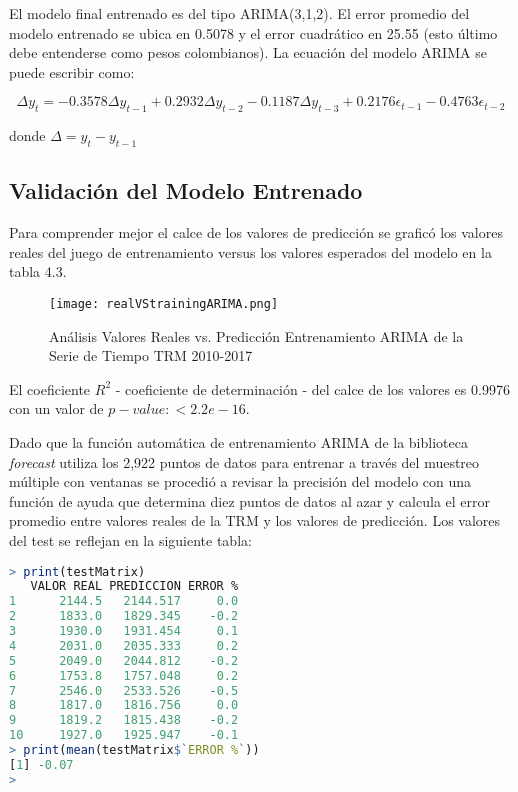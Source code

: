 El modelo final entrenado es del tipo ARIMA(3,1,2). El error promedio del modelo entrenado se ubica en 0.5078 y el error cuadrático en 25.55 (esto último debe entenderse como pesos colombianos). La ecuación del modelo ARIMA se puede escribir como:

\begin{equation}
    \Delta y_t = -0.3578 \Delta y_{t-1} + 0.2932 \Delta y_{t-2} - 0.1187 \Delta y_{t-3} + 0.2176 \epsilon_{t-1} -
    0.4763 \epsilon_{t-2}
\end{equation}

donde $\Delta = y_{t} - y_{t-1}$

\subsection{Validación del Modelo Entrenado}
Para comprender mejor el calce de los valores de predicción se graficó los valores reales del juego de entrenamiento versus los valores esperados del modelo en la tabla 4.3.

\begin{figure}[H]
    \centering
    \texttt{[image: realVStrainingARIMA.png]}
    \caption{Análisis Valores Reales vs. Predicción Entrenamiento ARIMA de la Serie de Tiempo TRM 2010-2017}
\end{figure}

El coeficiente $R^2$ - coeficiente de determinación - del calce de los valores es 0.9976 con un valor de $p-value: < 2.2e-16$.

Dado que la función automática de entrenamiento ARIMA de la biblioteca \emph{forecast} utiliza los 2,922 puntos de datos para entrenar a través del muestreo múltiple con ventanas se procedió a revisar la precisión del modelo con una función de ayuda que determina diez puntos de datos al azar y calcula el error promedio entre valores reales de la TRM y los valores de predicción. Los valores del test se reflejan en la siguiente tabla:

\begin{lstlisting}[language=R]
> print(testMatrix)
   VALOR REAL PREDICCION ERROR %
1      2144.5   2144.517     0.0
2      1833.0   1829.345    -0.2
3      1930.0   1931.454     0.1
4      2031.0   2035.333     0.2
5      2049.0   2044.812    -0.2
6      1753.8   1757.048     0.2
7      2546.0   2533.526    -0.5
8      1817.0   1816.756     0.0
9      1819.2   1815.438    -0.2
10     1927.0   1925.947    -0.1
> print(mean(testMatrix$`ERROR %`))
[1] -0.07
>
\end{lstlisting}

